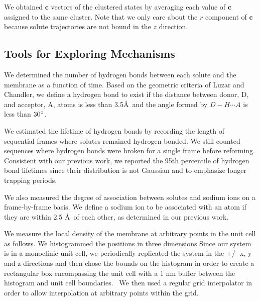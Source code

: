 \documentclass[journal=jpcbfk,manuscript=article]{achemso}
\begin{document}
  We obtained $\mathbf{c}$ vectors of the clustered states by averaging 
  each value of $\mathbf{c}$ assigned to the same cluster. Note that we only care
  about the $r$ component of $\mathbf{c}$ because solute trajectories are not 
  bound in the $z$ direction.
  

  \subsection{Tools for Exploring Mechanisms}\label{method:interactions}
  
  We determined the number of hydrogen bonds between each solute and the membrane
  as a function of time. Based on the geometric criteria of Luzar and Chandler, we 
  define a hydrogen bond to exist if the distance between donor, D, and acceptor, 
  A, atoms is less than 3.5\AA~and the angle formed by $D-H \cdots A$ is less than 
  $30\degree$.~\cite{luzar_effect_1996}
  
  We estimated the lifetime of hydrogen bonds by recording the length of 
  sequential frames where solutes remained hydrogen bonded. We still counted sequences
  where hydrogen bonds were broken for a single frame before reforming. Consistent
  with our previous work, we reported the 95th percentile of hydrogen bond lifetimes
  since their distribution is not Gaussian and to emphasize longer trapping periods.~\cite{coscia_chemically_2019}
  
  We also measured the degree of association between solutes and sodium ions on a
  frame-by-frame basis. We define a sodium ion to be associated with an atom if they
  are within 2.5 \AA~of each other, as determined in our previous work.~\cite{coscia_chemically_2019}
  
  We measure the local density of the membrane at arbitrary
  points in the unit cell as follows. We histogrammed the positions in three dimensions
  Since our system is in a monoclinic unit cell, we periodically replicated
  the system in the +/- x, y and z directions and then chose the bounds on the
  histogram in order to create a rectangular box encompassing the unit cell with
  a 1 nm buffer between the histogram and unit cell boundaries.~\cite{van_der_walt_numpy_2011} We then used a regular
  grid interpolator in order to allow interpolation at arbitrary points within the grid.~\cite{virtanen_scipy_2020} 
  
\end{document}
